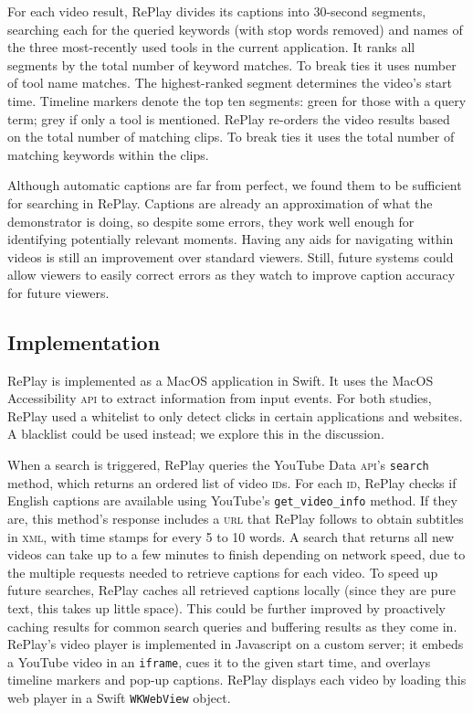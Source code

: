 For each video result, RePlay divides its captions into 30-second segments, searching each for the queried keywords (with stop words removed) and names of the three most-recently used tools in the current application. It ranks all segments by the total number of keyword matches. To break ties it uses number of tool name matches. The highest-ranked segment determines the video's start time. Timeline markers denote the top ten segments: green for those with a query term; grey if only a tool is mentioned. RePlay re-orders the video results based on the total number of matching clips. To break ties it uses the total number of matching keywords within the clips.

Although automatic captions are far from perfect, we found them to be sufficient for searching in RePlay. Captions are already an approximation of what the demonstrator is doing, so despite some errors, they work well enough for identifying potentially relevant moments. Having any aids for navigating within videos is still an improvement over standard viewers. Still, future systems could allow viewers to easily correct errors as they watch to improve caption accuracy for future viewers.

\subsection{Implementation}
RePlay is implemented as a Mac\-OS application in Swift. It uses the Mac\-OS Accessibility \textsc{api} to extract information from input events. For both studies, RePlay used a whitelist to only detect clicks in certain applications and websites. A blacklist could be used instead; we explore this in the discussion.

When a search is triggered, RePlay queries the YouTube Data \textsc{api}'s \texttt{search} method, which returns an ordered list of video \textsc{id}s. For each \textsc{id}, RePlay checks if English captions are available using YouTube's \texttt{get\_video\_info} method. If they are, this method's response includes a \textsc{url} that RePlay follows to obtain subtitles in \textsc{xml}, with time stamps for every 5 to 10 words. A search that returns all new videos can take up to a few minutes to finish depending on network speed, due to the multiple requests needed to retrieve captions for each video. To speed up future searches, RePlay caches all retrieved captions locally (since they are pure text, this takes up little space). This could be further improved by proactively caching results for common search queries and buffering results as they come in. RePlay's video player is implemented in Javascript on a custom server; it embeds a YouTube video in an \texttt{iframe}, cues it to the given start time, and overlays timeline markers and pop-up captions. RePlay displays each video by loading this web player in a Swift \texttt{WKWebView} object. 